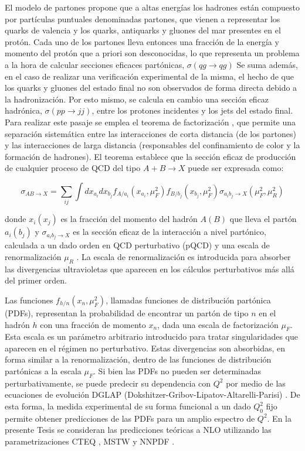 El modelo de partones propone que a altas energías los hadrones están compuesto por partículas puntuales denominadas partones, que vienen a representar los quarks de valencia y los quarks, antiquarks y gluones del mar presentes en el protón. Cada uno de los partones lleva entonces una fracción de la energía y momento del protón que a priori son desconocidas, lo que representa un problema a la hora de calcular secciones eficaces partónicas, $\sigma(qg\to qg)$
Se suma además, en el caso de realizar una verificación experimental de la misma, el hecho de que los quarks y gluones del estado final no son observados de forma directa debido a la hadronización. Por esto mismo, se calcula en cambio una sección eficaz hadrónica, $\sigma(pp\to jj)$, entre los protones incidentes y los jets del estado final. Para realizar este pasaje se emplea el teorema de factorización \cite{ELLIS1978281}, que permite una separación sistemática
entre las interacciones de corta distancia (de los partones) y las interacciones de larga distancia (responsables del confinamiento de color y la formación de hadrones). El teorema establece que la sección eficaz de producción de cualquier proceso de QCD del tipo $A+B\to X$ puede ser expresada como:

\begin{equation}
	\label{eq:xs_fact}
	\sigma_{AB\to X} = \sum_{ij} \int dx_{a_i} dx_{b_j} f_{A/a_i}(x_{a_i}, \mu_{F}^2) f_{B/b_j}(x_{b_j}, \mu_{F}^2) \sigma_{a_i b_j \to X}(\mu_{F}^2, \mu_{R}^2)
\end{equation}
%

donde $x_i(x_j)$ es la fracción del momento del hadrón $A(B)$ que lleva el partón $a_i(b_j)$ y $\sigma_{a_i b_j \to X}$ es la sección eficaz de la interacción a nivel partónico, calculada a un dado orden en QCD perturbativo (pQCD) y una escala de renormalización $\mu_R$ \cite{tesis_martin}. La escala de renormalización es introducida
para absorber las divergencias ultravioletas que aparecen en los cálculos perturbativos más
allá del primer orden.

Las funciones $f_{h/n}(x_{n}, \mu_{F}^2)$, llamadas funciones de distribución partónica (PDFs), representan la probabilidad de encontrar un partón de tipo $n$ en el hadrón $h$ con una fracción de
momento $x_n$, dada una escala de factorización $\mu_{F}$. Esta escala es un parámetro arbitrario
introducido para tratar singularidades que aparecen en el régimen no perturbativo. Estas
divergencias son absorbidas, en forma similar a la renormalización, dentro de las funciones
de distribución partónicas a la escala $\mu_F$. Si bien las PDFs no pueden ser determinadas
perturbativamente, se puede predecir su dependencia con $Q^2$ por medio de las ecuaciones
de evolución DGLAP (Dokshitzer-Gribov-Lipatov-Altarelli-Parisi) \cite{di_scattering,lipatov_parton,altarelli-parisi}. De esta forma, la
medida experimental de su forma funcional a un dado $Q^2_0$ fijo permite obtener predicciones
de las PDFs para un amplio espectro de $Q^2$. En la presente Tesis se consideran las predicciones teóricas a NLO utilizando las parametrizaciones CTEQ \cite{cteq}, MSTW \cite{mstw1, mstw2, mstw3} y NNPDF \cite{nnpdf}.

